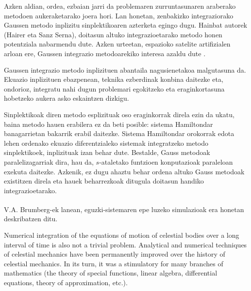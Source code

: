 Azken aldian, ordea, ezbaian jarri da problemaren zurruntasunaren araberako metodoen aukeraketarako joera hori. Lan honetan, zenbakizko integraziorako Gaussen metodo inplizitu sinplektikoaren azterketa egingo dugu. Hainbat autorek (Hairer \cite{Hairer2006,Hairer2008} eta Sanz Serna\cite{JMSanz-Serna1994}), doitasun altuko integrazioetarako metodo honen potentziala nabarmendu dute. Azken urteetan, espazioko satelite artifizialen arloan ere, Gaussen integrazio metodoarekiko interesa azaldu dute \cite{Bradley2014,Beylkin2014}. 

Gaussen integrazio metodo inplizituen abantaila nagusienetakoa malgutasuna da. Ekuazio inplizituen ebazpenean, teknika ezberdinak konbina daitezke eta, ondorioz, integratu nahi dugun problemari egokitzeko eta eraginkortasuna hobetzeko aukera asko eskaintzen dizkigu.

Sinplektikoak diren metodo esplizituak oso eraginkorrak direla ezin da ukatu, baina metodo hauen erabilera ez da beti posible: sistema Hamiltondar banagarrietan bakarrik erabil daitezke. Sistema Hamiltondar orokorrak edota lehen ordenako ekuazio diferentzialeko sistemak integratzeko metodo sinplektikoek, inplizituak izan behar dute. Bestalde, Gauss metodoak paralelizagarriak dira, hau da, $s$-ataletako funtzioen konputazioak paraleloan exekuta daitezke. Azkenik, ez dugu ahaztu behar ordena altuko Gauss metodoak existitzen direla  eta hauek beharrezkoak ditugula doitasun handiko integrazioetarako.     


\paragraph*{} V.A. Brumberg-ek \cite[2012]{Brumberg2013} lanean, eguzki-sistemaren epe luzeko simulazioak era honetan deskribatzen ditu.
\begin{displayquote}
Numerical integration of the equations of motion of celestial bodies over a long interval of time is also not a trivial problem. Analytical and numerical techniques of celestial mechanics have been permanently improved over the history of celestial mechanics. In its turn, it was a stimulatory for many branches of mathematics (the theory of special functions, linear algebra, differential equations, theory of approximation, etc.).
\end{displayquote}  

